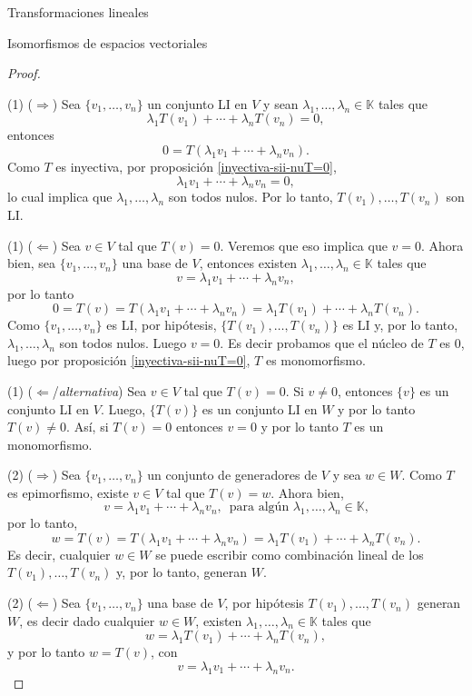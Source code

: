 \documentclass[a4paper,12pt,twoside,spanish]{amsbook}
\theoremstyle{definition}
\theoremstyle{remark}
\newcommand{\K}{\mathbb K}
\begin{document}
\begin{chapter}{Transformaciones lineales}
\begin{section}{Isomorfismos de espacios vectoriales}
\begin{proof}
			\
			
			
			(1) ($\Rightarrow$) Sea $\{v_1,\ldots,v_n \}$ un conjunto LI en $V$ y sean  $\lambda_1,\ldots,\lambda_n \in \K$ tales que
			$$
			\lambda_1T(v_1) +\cdots+ \lambda_{n}T(v_n) =0,
			$$
			entonces
			$$
			0 = T(\lambda_1v_1+\cdots + \lambda_{n}v_n).
			$$
			Como $T$  es inyectiva, por proposición \ref{inyectiva-sii-nuT=0}, 
			$$
			\lambda_1v_1+\cdots + \lambda_{n}v_n =0,
			$$
			lo cual implica que $\lambda_1,\ldots,\lambda_n$ son todos nulos. Por lo tanto,  $T(v_1),\ldots,T(v_n)$ son LI.
			
			
			(1) ($\Leftarrow$) Sea $v \in V$ tal que $T(v)=0$. Veremos que eso implica que $v =0$.  Ahora bien, sea  $\{v_1,\ldots,v_n \}$ una base de $V$,  entonces existen $\lambda_1,\ldots,\lambda_n \in \K$ tales que
			$$
			v = \lambda_1v_1+\cdots + \lambda_{n}v_n,
			$$
			por lo tanto
			$$
			0 = T(v) = T(\lambda_1v_1+\cdots + \lambda_{n}v_n) = \lambda_1T(v_1) +\cdots+ \lambda_{n}T(v_n).
			$$
			Como $\{v_1,\ldots,v_n \}$ es LI, por hipótesis, $\{T(v_1),\ldots,T(v_n)\}$ es LI y, por lo tanto, $\lambda_1,\ldots,\lambda_n$ son todos nulos. Luego $v=0$. Es decir probamos  que el núcleo de $T$ es 0, luego por proposición \ref{inyectiva-sii-nuT=0}, $T$ es monomorfismo. 

		(1) ($\Leftarrow$/\textit{alternativa}) Sea $v \in V$ tal que $T(v)=0$.	Si $v\neq 0$, entonces $\{v\}$ es un conjunto LI en $V$. Luego, $\{T(v)\}$ es un conjunto LI en $W$ y por lo tanto $T(v)\neq 0$. Así, si $T(v)=0$ entonces $v=0$ y por lo tanto $T$ es un monomorfismo.
			  
			(2) ($\Rightarrow$) Sea   $\{v_1,\ldots,v_n \}$ un conjunto de generadores de $V$ y sea  $w \in W$. Como $T$  es epimorfismo, existe $v \in V$ tal que $T(v)=w$. Ahora bien, 
			$$
			v = \lambda_1v_1+\cdots + \lambda_{n}v_n,\, \text{ para algún $\lambda_1,\ldots,\lambda_n \in \K$,}
			$$
			por lo tanto,
			$$
			w =T(v) = T(\lambda_1v_1+\cdots + \lambda_{n}v_n) = \lambda_1T(v_1) +\cdots+ \lambda_{n}T(v_n).
			$$ 
			Es decir,  cualquier $w \in W$ se puede escribir como combinación lineal de los  $T(v_1),\ldots,T(v_n)$ y, por lo tanto,  generan $W$.
			
			(2) ($\Leftarrow$) Sea $\{v_1,\ldots,v_n \}$ una base de $V$, por hipótesis $T(v_1),\ldots,T(v_n)$ generan $W$,  es decir dado cualquier $w \in W$,   existen $\lambda_1,\ldots,\lambda_n \in \K$ tales que
			$$
			w = \lambda_1T(v_1)+\cdots + \lambda_{n}T(v_n),
			$$
			y por lo tanto $w = T(v)$,  con 
			$$
			v = \lambda_1v_1+\cdots + \lambda_{n}v_n.
			$$
		\end{proof}
		

\end{section}
\end{chapter}
\end{document}
